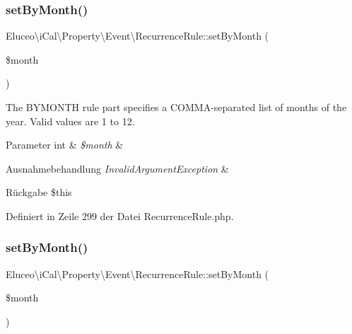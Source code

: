 \subsubsection{\texorpdfstring{set\+By\+Month()}{setByMonth()}\hspace{0.1cm}{\footnotesize\ttfamily [1/3]}}
{\footnotesize\ttfamily Eluceo\textbackslash{}i\+Cal\textbackslash{}\+Property\textbackslash{}\+Event\textbackslash{}\+Recurrence\+Rule\+::set\+By\+Month (\begin{DoxyParamCaption}\item[{}]{\$month }\end{DoxyParamCaption})}

The B\+Y\+M\+O\+N\+TH rule part specifies a C\+O\+M\+M\+A-\/separated list of months of the year. Valid values are 1 to 12.


\begin{DoxyParams}[1]{Parameter}
int & {\em \$month} & \\
\hline
\end{DoxyParams}

\begin{DoxyExceptions}{Ausnahmebehandlung}
{\em Invalid\+Argument\+Exception} & \\
\hline
\end{DoxyExceptions}
\begin{DoxyReturn}{Rückgabe}
\$this 
\end{DoxyReturn}


Definiert in Zeile 299 der Datei Recurrence\+Rule.\+php.

\mbox{\label{class_eluceo_1_1i_cal_1_1_property_1_1_event_1_1_recurrence_rule_aa31c68d9cfd6355a0d8b2173ff2dedb5}} 
\subsubsection{\texorpdfstring{set\+By\+Month()}{setByMonth()}\hspace{0.1cm}{\footnotesize\ttfamily [2/3]}}
{\footnotesize\ttfamily Eluceo\textbackslash{}i\+Cal\textbackslash{}\+Property\textbackslash{}\+Event\textbackslash{}\+Recurrence\+Rule\+::set\+By\+Month (\begin{DoxyParamCaption}\item[{}]{\$month }\end{DoxyParamCaption})}

